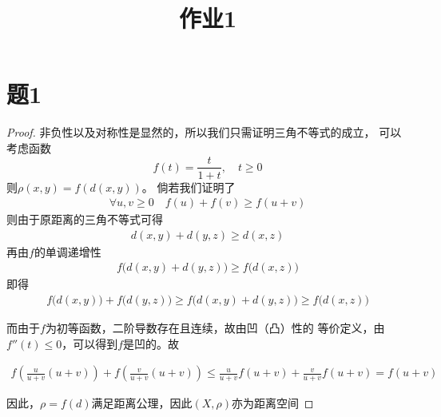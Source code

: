 \documentclass[cn]{homework}
\title{作业1}
\begin{document}
    \maketitle
    \section{题1}
    \begin{proof}
        非负性以及对称性是显然的，所以我们只需证明三角不等式的成立，
        可以考虑函数
        \[f(t)=\frac{t}{1+t},\quad t\geq 0\]
        则$\rho(x,y)=f(d(x,y))$。
        倘若我们证明了
        \begin{align*}
            \forall u,v\geq 0\quad
            f(u)+f(v)\geq f(u+v)
        \end{align*}
        则由于原距离的三角不等式可得
        \begin{align*}
            d(x,y)+d(y,z)\geq d(x,z)
        \end{align*}
        再由$f$的单调递增性
        \begin{align*}
            f\big(d(x,y)+d(y,z)\big)\geq f\big(d(x,z)\big)
        \end{align*}
        即得
        \begin{align*}
            f\big(d(x,y)\big)+f\big(d(y,z)\big)
            \geq f\big(d(x,y)+d(y,z)\big)
            \geq f\big(d(x,z)\big)
        \end{align*}

        而由于$f$为初等函数，二阶导数存在且连续，故由凹（凸）性的
        等价定义，由$f''(t)\leq 0$，可以得到$f$是凹的。故
        \begin{fullwidth}
        \begin{align*}
            f\left(\frac{u}{u+v}(u+v)\right)+f\left(\frac{v}{u+v}(u+v)\right)
            \leq\frac{u}{u+v}f(u+v)+\frac{v}{u+v}f(u+v)
            =f(u+v)
        \end{align*}
        \end{fullwidth}
        
        因此，$\rho=f(d)$满足距离公理，因此$(X,\rho)$亦为距离空间
    \end{proof}
\end{document}
